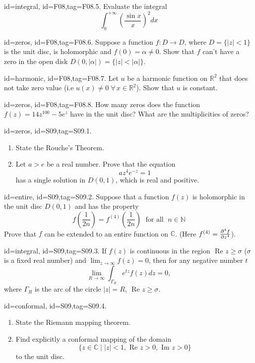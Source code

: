 \documentclass[12pt,letterpaper]{article}
\theoremstyle{plain}
\theoremstyle{definition}
\begin{document}
{\item[id=integral, id=F08,tag=F08.5.]
Evaluate the integral
\[
	\int_{0}^{+\infty} \left(\frac{\sin x}{x}\right)^2 dx
\]

\item[id=zeros, id=F08,tag=F08.6.]
Suppose a function $f : D \rightarrow D$, where $D = \{| z | < 1\}$ is the unit disc, is holomorphic and $f(0) = \alpha \ne 0$. Show that $f$ can't have a zero in the open disk $D(0,| \alpha |) = \{| z | < | \alpha |\}$.

\item[id=harmonic, id=F08,tag=F08.7.]
Let $u$ be a harmonic function on $\mathbb{R}^2$ that does not take zero value (i.e $u(x) \ne 0 \; \forall \, x \in \mathbb{R}^2$). Show that $u$ is constant.

\item[id=zeros, id=F08,tag=F08.8.]
How many zeros does the function $f(z) = 14z^{100} - 5 e^z$ have in the unit disc? What are the multiplicities of zeros?


\item[id=zeros, id=S09,tag=S09.1.]
\begin{enumerate}[label=(\alph*)]\onlyitems
\item State the Rouche's Theorem.
\item Let $a > e$ be a real number. Prove that the equation
\[
	a z^4 e^{-z} = 1
\]
has a single solution in $D(0,1)$, which is real and positive.
\end{enumerate}

\item[id=entire, id=S09,tag=S09.2.]
Suppose that a function $f(z)$ is holomorphic in the unit disc $D(0,1)$ and has the property
\[
	f\left(\frac{1}{2n}\right) = f^{(4)}\left(\frac{1}{2n}\right) \; \text{ for all } \; n \in \mathbb{N}
\]
Prove that $f$ can be extended to an entire function on $\mathbb{C}$. (Here $f^{(4)} = \pdv[4]{f}{z}$).

\item[id=integral, id=S09,tag=S09.3.]
If $f(z)$ is continuous in the region $\text{ Re } z \ge \sigma$ ($\sigma$ is a fixed real number) and $\lim_{z\rightarrow\infty} f(z) = 0$, then for any negative number $t$
\[
	\lim_{R\rightarrow\infty}\int_{\Gamma_R}e^{tz} f(z) dz = 0,
\]
where $\Gamma_R$ is the arc of the circle $| z | = R$, $\text{ Re } z \ge \sigma$.

\item[id=conformal, id=S09,tag=S09.4.]
\begin{enumerate}[label=(\alph*)]\onlyitems
\item State the Riemann mapping theorem.
\item Find explicitly a conformal mapping of the domain
\[
	\{z \in \mathbb{C} \mid | z | < 1, \text{ Re } z > 0, \text{ Im } z > 0 \}
\]
to the unit disc.
\end{enumerate}

}
\end{document}
